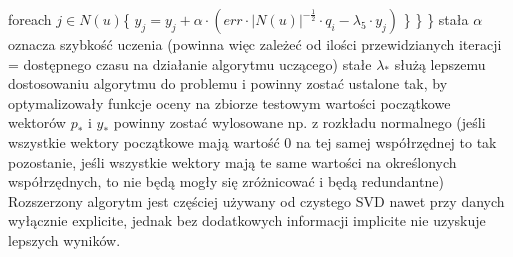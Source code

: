 \documentclass{pracamgr}
\begin{document}
    \hspace*{48pt}			foreach $j\in N(u)$\{\newline
    \hspace*{64pt}				$y_j=y_j+\alpha\cdot(err\cdot |N(u)|^{-\frac{1}{2}}\cdot q_i-\lambda_5\cdot y_j)$\newline
    \hspace*{48pt}			\}\newline
    \hspace*{32pt}		\}\newline
    \hspace*{16pt}	\}\newline
     {\scriptsize
      stała $\alpha$ oznacza szybkość uczenia (powinna więc zależeć od ilości przewidzianych iteracji = dostępnego czasu na działanie algorytmu uczącego)\newline
      stałe $\lambda_*$ służą lepszemu dostosowaniu algorytmu do problemu i powinny zostać ustalone tak, by optymalizowały funkcje oceny na zbiorze testowym\newline
      wartości początkowe wektorów $p_*$ i $y_*$ powinny zostać wylosowane np. z rozkładu normalnego
      (jeśli wszystkie wektory początkowe mają wartość $0$ na tej samej współrzędnej to tak pozostanie,
      jeśli wszystkie wektory mają te same wartości na określonych współrzędnych, to nie będą mogły się zróżnicować i będą redundantne)
     }\newline
     Rozszerzony algorytm jest częściej używany od czystego SVD nawet przy danych wyłącznie explicite,
     jednak bez dodatkowych informacji implicite nie uzyskuje lepszych wyników.
  
\end{document}
